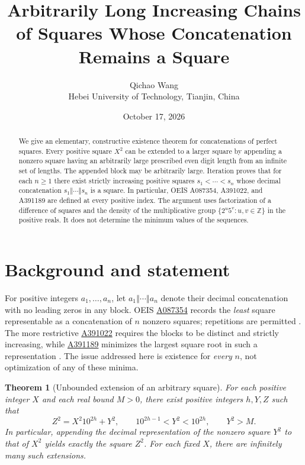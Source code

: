 \documentclass[9pt]{extarticle}
\title{Arbitrarily Long Increasing Chains of Squares Whose Concatenation Remains a Square}
\author{Qichao Wang\\\small Hebei University of Technology, Tianjin, China}
\date{October 17, 2026}\linespread{0.98}\setlength{\abovedisplayskip}{6pt}\setlength{\belowdisplayskip}{6pt}
\newtheorem{theorem}{Theorem}
\newcommand{\cat}{\mathbin{\Vert}}
\begin{document}
\maketitle
\begin{abstract}
We give an elementary, constructive existence theorem for concatenations of
perfect squares. Every positive square $X^2$ can be extended to a larger
square by appending a nonzero square having an arbitrarily large prescribed
even digit length from an infinite set of lengths. The appended block may
be arbitrarily large. Iteration proves that for each $n\ge1$ there exist
strictly increasing positive squares $s_1<\cdots<s_n$ whose decimal
concatenation $s_1\cat\cdots\cat s_n$ is a square. In particular,
OEIS A087354, A391022, and A391189 are defined at every positive index.
The argument uses factorization of a difference of squares and the density
of the multiplicative group $\{2^u5^v:u,v\in\mathbb Z\}$ in the
positive reals. It does not determine the minimum values of the sequences.
\end{abstract}

\section{Background and statement}
For positive integers $a_1,\ldots,a_n$, let
$a_1\cat\cdots\cat a_n$ denote their decimal concatenation with no
leading zeros in any block. OEIS \href{https://oeis.org/A087354}{A087354}
records the \emph{least} square representable as a concatenation of
$n$ nonzero squares; repetitions are permitted \cite{oeis87354}.
The more restrictive \href{https://oeis.org/A391022}{A391022}
requires the blocks to be distinct and strictly increasing, while
\href{https://oeis.org/A391189}{A391189} minimizes the largest
square root in such a representation \cite{oeis391022,oeis391189}.
The issue addressed here is existence for \emph{every} $n$, not
optimization of any of these minima.

\begin{theorem}[Unbounded extension of an arbitrary square]\label{thm:extend}
For each positive integer $X$ and each real bound $M>0$, there exist
positive integers $h,Y,Z$ such that
\begin{equation}\label{eq:extend}
 Z^2=X^2 10^{2h}+Y^2,\qquad
 10^{2h-1}<Y^2<10^{2h},\qquad Y^2>M.
\end{equation}
In particular, appending the decimal representation of the nonzero
square $Y^2$ to that of $X^2$ yields exactly the square $Z^2$.
For each fixed $X$, there are infinitely many such extensions.
\end{theorem}
\end{document}
